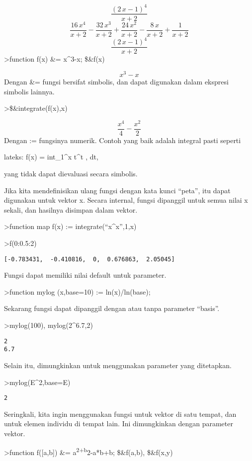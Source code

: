 \documentclass[
]{book}
\begin{document}
\[\frac{\left(2\,x-1\right)^4}{x+2}\] \[\frac{16\,x^4}{x+2}-\frac{32\,x^3}{x+2}+\frac{24\,x^2}{x+2}-\frac{8\,x}{x+2}+\frac{1}{x+2}\] \[\frac{\left(2\,x-1\right)^4}{x+2}\]\textgreater function f(x) \&= x\^{}3-x; \$\&f(x)

\[x^3-x\]Dengan \&= fungsi bersifat simbolis, dan dapat digunakan dalam ekspresi simbolis lainnya.

\textgreater\$\&integrate(f(x),x)

\[\frac{x^4}{4}-\frac{x^2}{2}\]Dengan := fungsinya numerik. Contoh yang baik adalah integral pasti seperti

lateks: f(x) = int\_1\^{}x t\^{}t , dt,

yang tidak dapat dievaluasi secara simbolis.

Jika kita mendefinisikan ulang fungsi dengan kata kunci ``peta'', itu dapat digunakan untuk vektor x. Secara internal, fungsi dipanggil untuk semua nilai x sekali, dan hasilnya disimpan dalam vektor.

\textgreater function map f(x) := integrate(``x\^{}x'',1,x)

\textgreater f(0:0.5:2)

\begin{verbatim}
[-0.783431,  -0.410816,  0,  0.676863,  2.05045]
\end{verbatim}

Fungsi dapat memiliki nilai default untuk parameter.

\textgreater function mylog (x,base=10) := ln(x)/ln(base);

Sekarang fungsi dapat dipanggil dengan atau tanpa parameter ``basis''.

\textgreater mylog(100), mylog(2\^{}6.7,2)

\begin{verbatim}
2
6.7
\end{verbatim}

Selain itu, dimungkinkan untuk menggunakan parameter yang ditetapkan.

\textgreater mylog(E\^{}2,base=E)

\begin{verbatim}
2
\end{verbatim}

Seringkali, kita ingin menggunakan fungsi untuk vektor di satu tempat, dan untuk elemen individu di tempat lain. Ini dimungkinkan dengan parameter vektor.

\textgreater function f({[}a,b{]}) \&= a\textsuperscript{2+b}2-a*b+b; \$\&f(a,b), \$\&f(x,y)
\end{document}

